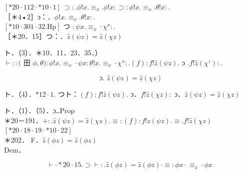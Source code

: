 \documentclass[10pt]{article}
\begin{document}
$[* 20 \cdot 112 \cdot * 10 \cdot 1] ~ \supset: . \phi!x . \equiv_{x} . \phi!x: \supset: \phi!x . \equiv_{x} . \theta!x:$.\\
［＊4•2］ɔ：．$\phi!x . \equiv_{x} . \theta!x:$.\\
$[* 10 \cdot 301 \cdot 32 . \mathrm{Hp}]$ つ $: \psi x . \equiv_{x} \cdot \chi^{x}:$.\\
［＊20．15］つ：．$\hat{z}(\psi z)=\hat{z}(\chi z)$

ト．（3）．＊10．11．23．35．）\\
$\vdash::($ 田 $\phi, \theta): \phi!x . \equiv_{x} \cdot \psi x: \theta!x . \equiv_{x} \cdot \chi^{x}: .(f): f!\hat{z}(\psi z)$. ɔ $. f!\hat{z}\left(\chi^{z}\right):$.


\begin{equation*}
\text { ɔ. } \hat{z}(\psi z)=\hat{z}(\chi z) \tag{4}
\end{equation*}


ト．（4）．$* 12 \cdot 1$. つト：$(f): f!\hat{z}(\psi z)$. ɔ．$f!\hat{z}(\chi z):$ ɔ．$\hat{z}(\psi z)=\hat{z}(\chi z)$

ト．（1）．（5）．ɔ‥Prop\\
＊20－191．$+: . \hat{z}(\psi z)=\hat{z}(\chi z) . \equiv:(f): f!\hat{z}(\psi z) . \equiv . f!\hat{z}(\chi z)$\\
$[* 20 \cdot 18 \cdot 19 \cdot * 10 \cdot 22]$\\
＊202． F．$\hat{z}(\phi z)=\hat{z}(\phi z)$\\
Dem．


\begin{equation*}
\vdash \cdot * 20 \cdot 15 . \supset \vdash: . \hat{z}(\phi z)=\hat{z}(\phi z) \cdot \equiv: \phi x \cdot \equiv_{x} \cdot \phi x \tag{1}
\end{equation*}
\end{document}
